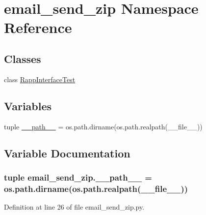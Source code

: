 \hypertarget{namespaceemail__send__zip}{\section{email\-\_\-send\-\_\-zip Namespace Reference}
\label{namespaceemail__send__zip}
}
\subsection*{Classes}
\begin{DoxyCompactItemize}
\item 
class \hyperlink{classemail__send__zip_1_1RappInterfaceTest}{Rapp\-Interface\-Test}
\end{DoxyCompactItemize}
\subsection*{Variables}
\begin{DoxyCompactItemize}
\item 
tuple \hyperlink{namespaceemail__send__zip_a42e8693b0f60358baaeae0deeddfd71d}{\-\_\-\-\_\-path\-\_\-\-\_\-} = os.\-path.\-dirname(os.\-path.\-realpath(\-\_\-\-\_\-file\-\_\-\-\_\-))
\end{DoxyCompactItemize}


\subsection{Variable Documentation}
\hypertarget{namespaceemail__send__zip_a42e8693b0f60358baaeae0deeddfd71d}{
\subsubsection[{\-\_\-\-\_\-path\-\_\-\-\_\-}]{\setlength{\rightskip}{0pt plus 5cm}tuple email\-\_\-send\-\_\-zip.\-\_\-\-\_\-path\-\_\-\-\_\- = os.\-path.\-dirname(os.\-path.\-realpath(\-\_\-\-\_\-file\-\_\-\-\_\-))}}\label{namespaceemail__send__zip_a42e8693b0f60358baaeae0deeddfd71d}


Definition at line 26 of file email\-\_\-send\-\_\-zip.\-py.

